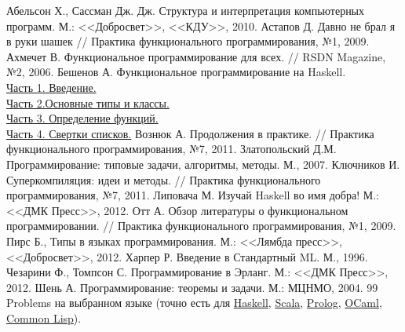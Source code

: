 \documentclass[
  paper=a4,
  fontsize=14pt,
  openany,
  appendixprefix=true
]{scrbook}
\begin{document}
\begin{thebibliography}{99}
Абельсон Х., Сассман Дж. Дж. Структура и интерпретация компьютерных программ. М.: <<Добросвет>>, <<КДУ>>, 2010.
Астапов Д. Давно не брал я в руки шашек // Практика функционального программирования, №1, 2009.
Ахмечет В. Функциональное программирование для всех. // RSDN Magazine, №2, 2006.
Бешенов А. Функциональное программирование на Haskell.\\
\href{http://www.ibm.com/developerworks/ru/library/l-haskell/}{Часть 1. Введение.}\\
\href{http://www.ibm.com/developerworks/ru/library/l-haskell2/}{Часть 2.Основные типы и классы.}\\
\href{http://www.ibm.com/developerworks/ru/library/l-haskell3/}{Часть 3. Определение функций.}\\
\href{http://www.ibm.com/developerworks/ru/library/l-haskell4/}{Часть 4. Свертки списков.}
Вознюк А. Продолжения в практике. // Практика функционального программирования, №7, 2011.
Златопольский Д.М. Программирование: типовые задачи, алгоритмы, методы. М., 2007.
Ключников И. Суперкомпиляция: идеи и методы. // Практика функционального программирования, №7, 2011.
Липовача М. Изучай Haskell во имя добра! М.: <<ДМК Пресс>>, 2012.
Отт А. Обзор литературы о функциональном программировании. // Практика функционального программирования, №1, 2009.
Пирс Б., Типы в языках программирования. М.: <<Лямбда пресс>>, <<Добросвет>>, 2012.
Харпер Р. Введение в Стандартный ML. М., 1996.
Чезарини Ф., Томпсон С. Программирование в Эрланг. М.: <<ДМК Пресс>>,
2012.
Шень А. Программирование: теоремы и задачи. М.: МЦНМО, 2004.
99 Problems на выбранном языке (точно есть для \href{http://www.haskell.org/haskellwiki/99_questions}{Haskell}, \href{http://aperiodic.net/phil/scala/s-99/}{Scala}, \href{https://sites.google.com/site/prologsite/prolog-problems}{Prolog}, \href{http://www.christiankissig.de/cms/index.php/en/programming/28-ocaml/28-99-problems-in-ocaml}{OCaml}, \href{http://www.informatimago.com/develop/lisp/l99/index.html}{Common Lisp}).

\end{thebibliography}
\end{document}
